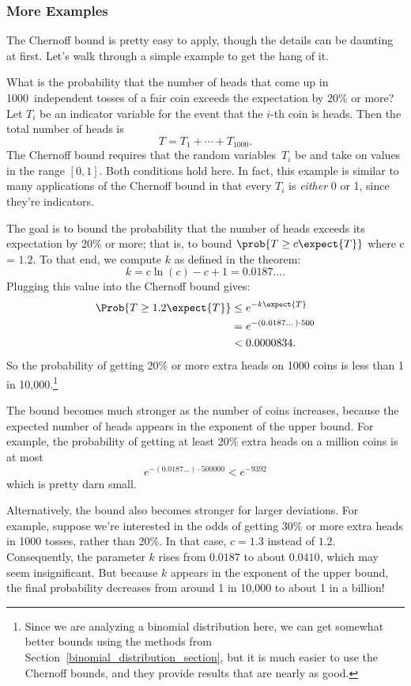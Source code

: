 \subsubsection{More Examples}

The Chernoff bound is pretty easy to apply, though the details can be
daunting at first.  Let's walk through a simple example to get the
hang of it.

What is the probability that the number of heads that come up in
1000~independent tosses of a fair coin exceeds the expectation by 20\%
or more?  Let $T_i$ be an indicator variable for the event that the
$i$-th coin is heads.  Then the total number of heads is
\begin{equation*}
    T = T_1 + \cdots + T_{1000}.
\end{equation*}
The Chernoff bound requires that the random variables~$T_i$ be
 and take on values in the range $[0, 1]$.
Both conditions hold here.  In fact, this example is similar to many
applications of the Chernoff bound in that every $T_i$ is
\emph{either} 0 or 1, since they're indicators.

The goal is to bound the probability that the number of heads exceeds
its expectation by 20\% or more; that is, to bound $\prob{T \geq c
  \expect{T}}$ where c = $1.2$.  To that end, we compute $k$ as
defined in the theorem:
\[
k = c \ln(c) - c + 1 = 0.0187\dots.
\]
Plugging this value into the Chernoff bound gives:
\begin{align*}
\Prob{T \geq 1.2 \expect{T}} & \leq  e^{- k \expect{T}} \\
  & = e^{- (0.0187\dots) \cdot 500} \\
  & <  0.0000834.
\end{align*}
So the probability of getting 20\% or more extra heads on 1000 coins
is less than 1 in 10,000.\footnote{Since we are analyzing a binomial
  distribution here, we can get somewhat better bounds using the
  methods from Section~\ref{binomial_distribution_section}, but it is
  much easier to use the Chernoff bounds, and they provide results
  that are nearly as good.}

The bound becomes much stronger as the number of coins increases,
because the expected number of heads appears in the exponent of the
upper bound.  For example, the probability of getting at least 20\%
extra heads on a million coins is at most
\[
e^{- (0.0187\dots) \cdot 500000} < e^{-9392}
\]
which is pretty darn small.

Alternatively, the bound also becomes stronger for larger deviations.
For example, suppose we're interested in the odds of getting 30\% or
more extra heads in 1000 tosses, rather than 20\%.  In that case,
$c= 1.3$ instead of $1.2$.  Consequently, the parameter $k$ rises from
$0.0187$ to about $0.0410$, which may seem insignificant.  But because
$k$ appears in the exponent of the upper bound, the final probability
decreases from around 1 in 10,000 to about 1 in a billion!

